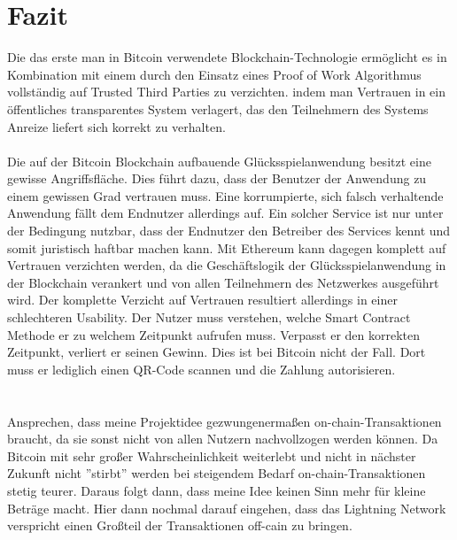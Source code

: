 \chapter{Fazit} %
Die das erste man in Bitcoin verwendete 
Blockchain-Technologie
ermöglicht es in Kombination mit einem
durch den Einsatz eines Proof of Work Algorithmus 
vollständig auf
Trusted Third Parties zu verzichten.
indem man Vertrauen 
in ein öffentliches transparentes System verlagert,
das den Teilnehmern des Systems Anreize liefert sich korrekt zu verhalten.\\\\

Die auf der Bitcoin Blockchain aufbauende Glücksspielanwendung besitzt eine gewisse Angriffsfläche. Dies führt dazu, dass der Benutzer der Anwendung zu einem gewissen Grad vertrauen muss. Eine korrumpierte, sich falsch verhaltende Anwendung fällt dem Endnutzer allerdings auf. Ein solcher Service ist nur unter der Bedingung nutzbar, dass der Endnutzer den Betreiber des Services kennt und somit juristisch haftbar machen kann. 
Mit Ethereum kann dagegen komplett auf Vertrauen verzichten werden, da die Geschäftslogik der Glücksspielanwendung in der Blockchain verankert und von allen Teilnehmern des Netzwerkes ausgeführt wird. Der komplette Verzicht auf Vertrauen resultiert allerdings in einer schlechteren Usability. Der Nutzer muss verstehen, welche Smart Contract Methode er zu welchem Zeitpunkt aufrufen muss. Verpasst er den korrekten Zeitpunkt, verliert er seinen Gewinn. Dies ist bei Bitcoin nicht der Fall. Dort muss er lediglich einen QR-Code scannen und die Zahlung autorisieren.\\\\\\


Ansprechen, dass meine Projektidee gezwungenermaßen on-chain-Transaktionen braucht, da sie sonst nicht von allen Nutzern nachvollzogen werden können. Da Bitcoin mit sehr großer Wahrscheinlichkeit weiterlebt und nicht in nächster Zukunft nicht ''stirbt'' werden bei steigendem Bedarf on-chain-Transaktionen stetig teurer. Daraus folgt dann, dass meine Idee keinen Sinn mehr für kleine Beträge macht. Hier dann nochmal darauf eingehen, dass das Lightning Network verspricht einen Großteil der Transaktionen off-cain zu bringen.
